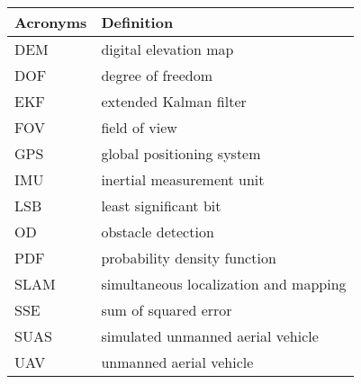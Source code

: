 \begin{center}
\begin{longtable}{ll}
  \hline
  \textbf{Acronyms} & \textbf{Definition} \\
  \hline\hline

DEM     &       digital elevation map\\
DOF     &       degree of freedom \\
EKF     &       extended Kalman filter \\
FOV	&	field of view	\\
GPS     &       global positioning system \\
IMU     &       inertial measurement unit \\
LSB     &       least significant bit  \\
OD      &       obstacle detection \\
PDF     &       probability density function \\
SLAM    &       simultaneous localization and mapping \\
SSE     &       sum of squared error\\
SUAS    &       simulated unmanned aerial vehicle \\
UAV     &       unmanned aerial vehicle\\
  \hline
\end{longtable}
\end{center}
